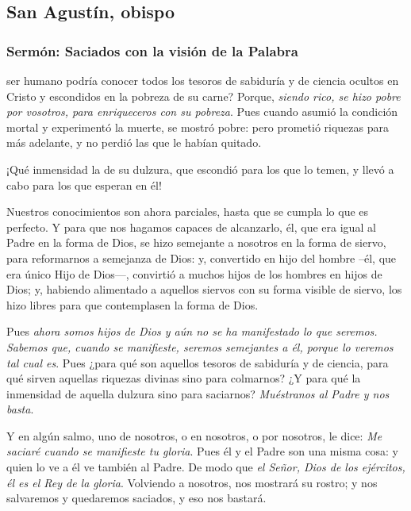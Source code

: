 \newsection

\subsection{San Agustín, obispo}

\subsubsection{Sermón: Saciados con la visión de la Palabra}


\begin{body}
	 ser humano podría conocer todos los tesoros de sabiduría y de ciencia ocultos en Cristo y escondidos en la pobreza de su carne? Porque, \emph{siendo rico, se hizo pobre por vosotros, para enriqueceros con su pobreza}. Pues cuando asumió la condición mortal y experimentó la muerte, se mostró pobre: pero prometió riquezas para más adelante, y no perdió las que le habían quitado.
	
	¡Qué inmensidad la de su dulzura, que escondió para los que lo temen, y llevó a cabo para los que esperan en él!
	
	Nuestros conocimientos son ahora parciales, hasta que se cumpla lo que es perfecto. Y para que nos hagamos capaces de alcanzarlo, él, que era igual al Padre en la forma de Dios, se hizo semejante a nosotros en la forma de siervo, para reformarnos a semejanza de Dios: y, convertido en hijo del hombre --él, que era único Hijo de Dios---, convirtió a muchos hijos de los hombres en hijos de Dios; y, habiendo alimentado a aquellos siervos con su forma visible de siervo, los hizo libres para que contemplasen la forma de Dios.
	
	Pues \emph{ahora somos hijos de Dios y aún no se ha manifestado lo que seremos. Sabemos que, cuando se manifieste, seremos semejantes a él, porque lo veremos tal cual es}. Pues ¿para qué son aquellos tesoros de sabiduría y de ciencia, para qué sirven aquellas riquezas divinas sino para colmarnos? ¿Y para qué la inmensidad de aquella dulzura sino para saciarnos? \emph{Muéstranos al Padre y nos basta}.
	
	Y en algún salmo, uno de nosotros, o en nosotros, o por nosotros, le dice: \emph{Me saciaré cuando se manifieste tu gloria}. Pues él y el Padre son una misma cosa: y quien lo ve a él ve también al Padre. De modo que \emph{el Señor, Dios de los ejércitos, él es el Rey de la gloria}. Volviendo a nosotros, nos mostrará su rostro; y nos salvaremos y quedaremos saciados, y eso nos bastará.
	

\end{body}
